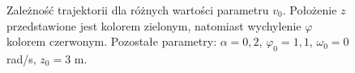 \documentclass[11pt]{article}
\begin{document}
\begin{figure}[h!]
\begin{center}
\quad
{}
\quad
{}
\caption{Zależność trajektorii dla różnych wartości parametru $v_0$. Położenie $z$ przedstawione jest kolorem
	zielonym, natomiast wychylenie $\varphi$ kolorem czerwonym.
	Pozostałe parametry: $\alpha=0,2$, $\varphi_0=1,1$, $\omega_0=0 $ rad/s, $z_0=3$ m.}{\label{wykV}}

\end{center}
\end{figure}
\end{document}
